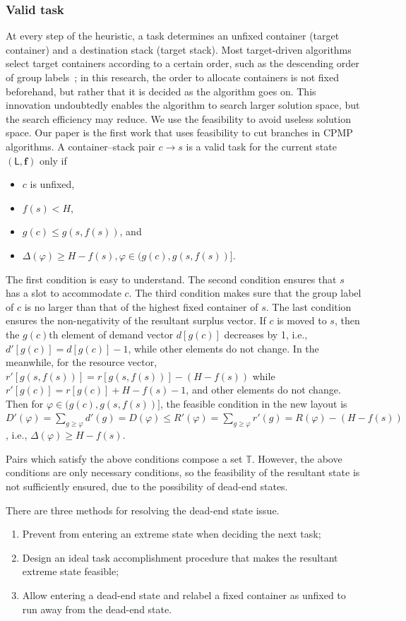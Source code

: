 \documentclass[review,3p,times,12pt,number]{elsarticle}\usepackage{amsmath}\usepackage{amssymb}
\begin{document}
\subsubsection{Valid task}
At every step of the heuristic, a {task} determines an unfixed container (target container) and a destination stack (target stack). Most target-driven algorithms select target containers according to a certain order, such as the descending order of group labels~\citep{exp2012}; in this research, the order to allocate containers is not fixed beforehand, but rather that it is decided as the algorithm goes on. This innovation undoubtedly enables the algorithm to search larger solution space, but the search efficiency may reduce. We use the feasibility to avoid useless solution space.
Our paper is the first work that uses feasibility to cut branches in CPMP algorithms.
A container--stack pair $c\rightarrow s$ is a valid task for the current state $( \mathsf{L},\boldsymbol{f})$ only if
\begin{itemize}
\item $c$ is unfixed,
\item $f(s)<H$,
\item $g(c)\le g(s,f(s))$, and
\item $\Delta(\varphi)\ge H-f(s), \varphi \in (g(c),g(s,f(s))]$.
\end{itemize}

The first condition is easy to understand. The second condition ensures that $s$ has a slot to accommodate $c$.
The third condition makes sure that the group label of $c$ is no larger than that of the highest fixed container of $s$.
The last condition ensures the non-negativity of the resultant surplus vector. If $c$ is moved to $s$, then the $g(c)$th element of demand vector $d[g(c)]$ decreases by 1, i.e., $d'[g(c)]=d[g(c)]-1$, while other elements do not change. In the meanwhile, for the resource vector, $r'[g(s,f(s))]=r[g(s,f(s))]-(H-f(s))$ while $r'[g(c)]=r[g(c)]+H-f(s)-1$, and other elements do not change. Then for $\varphi \in(g(c),g(s,f(s))]$, the feasible condition in the new layout is $D'(\varphi)=\sum_{g\ge \varphi}d'(g)=D(\varphi)\le R'(\varphi)=\sum_{g\ge\varphi}r'(g)=R(\varphi)-(H-f(s))$, i.e., $\Delta(\varphi)\ge H-f(s)$.

Pairs which satisfy the above conditions compose a set $\mathbb T$. However, the above conditions are only necessary conditions, so the feasibility of the resultant state is not sufficiently ensured, due to the possibility of dead-end states.

There are three methods for resolving the dead-end state issue.
\begin{enumerate}
\item Prevent from entering an extreme state when deciding the next task;
\item Design an ideal task accomplishment procedure that makes the resultant extreme state feasible;
\item Allow entering a dead-end state and relabel a fixed container as unfixed to run away from the dead-end state.
\end{enumerate}
\end{document}
